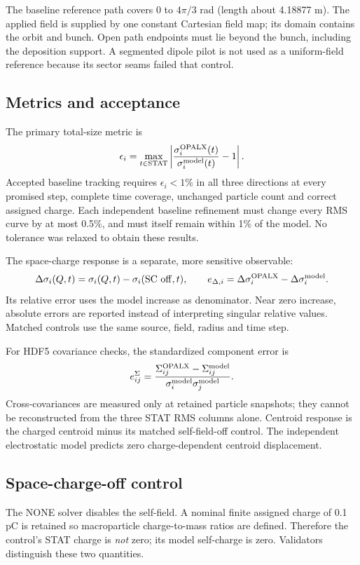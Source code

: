 \documentclass[10pt,a4paper]{article}
\begin{document}
The baseline reference path covers 0 to $4\pi/3$ rad (length about 4.18877 m).
The applied field is supplied by one constant Cartesian field map; its domain
contains the orbit and bunch. Open path endpoints must lie beyond the bunch,
including the deposition support. A segmented dipole pilot is not used as a
uniform-field reference because its sector seams failed that control.

\subsection{Metrics and acceptance}
The primary total-size metric is
\begin{equation}
 \epsilon_i=\max_{t\in\mathrm{STAT}}
 \left|\frac{\sigma_i^{\rm OPALX}(t)}{\sigma_i^{\rm model}(t)}-1\right| .
 \label{eq:error}
\end{equation}
Accepted baseline tracking requires $\epsilon_i<1\%$ in all three directions
at every promised step, complete time coverage, unchanged particle count and
correct assigned charge. Each independent baseline refinement must change
every RMS curve by at most 0.5\%, and must itself remain within 1\% of the model.
No tolerance was relaxed to obtain these results.

The space-charge response is a separate, more sensitive observable:
\begin{equation}
 \Delta\sigma_i(Q,t)=\sigma_i(Q,t)-\sigma_i(\mathrm{SC\ off},t),\qquad
 e_{\Delta,i}=\Delta\sigma_i^{\rm OPALX}-\Delta\sigma_i^{\rm model} .
 \label{eq:growth}
\end{equation}
Its relative error uses the model increase as denominator. Near zero increase,
absolute errors are reported instead of interpreting singular relative values.
Matched controls use the same source, field, radius and time step.

For HDF5 covariance checks, the standardized component error is
\begin{equation}
 e_{ij}^{\Sigma}=\frac{\Sigma_{ij}^{\rm OPALX}-\Sigma_{ij}^{\rm model}}
 {\sigma_i^{\rm model}\sigma_j^{\rm model}} .\label{eq:covmetric}
\end{equation}
Cross-covariances are measured only at retained particle snapshots; they cannot
be reconstructed from the three STAT RMS columns alone. Centroid response is
the charged centroid minus its matched self-field-off control. The independent
electrostatic model predicts zero charge-dependent centroid displacement.

\subsection{Space-charge-off control}
The NONE solver disables the self-field. A nominal finite assigned charge of
0.1 pC is retained so macroparticle charge-to-mass ratios are defined. Therefore
the control's STAT charge is \emph{not} zero; its model self-charge is zero.
Validators distinguish these two quantities.
\end{document}
